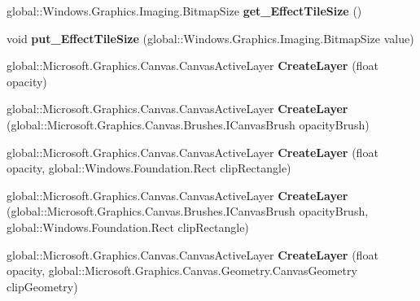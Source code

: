 \begin{DoxyCompactItemize}
global\+::\+Windows.\+Graphics.\+Imaging.\+Bitmap\+Size {\bfseries get\+\_\+\+Effect\+Tile\+Size} ()
\item 
\mbox{\label{class_microsoft_1_1_graphics_1_1_canvas_1_1_canvas_drawing_session_a1117e02a854af2c00904eea362dfe10f}} 
void {\bfseries put\+\_\+\+Effect\+Tile\+Size} (global\+::\+Windows.\+Graphics.\+Imaging.\+Bitmap\+Size value)
\item 
\mbox{\label{class_microsoft_1_1_graphics_1_1_canvas_1_1_canvas_drawing_session_acdb06f146f507d5ed91c5780afe92052}} 
global\+::\+Microsoft.\+Graphics.\+Canvas.\+Canvas\+Active\+Layer {\bfseries Create\+Layer} (float opacity)
\item 
\mbox{\label{class_microsoft_1_1_graphics_1_1_canvas_1_1_canvas_drawing_session_a5e5f209e443e8e7be3fe82510d320872}} 
global\+::\+Microsoft.\+Graphics.\+Canvas.\+Canvas\+Active\+Layer {\bfseries Create\+Layer} (global\+::\+Microsoft.\+Graphics.\+Canvas.\+Brushes.\+I\+Canvas\+Brush opacity\+Brush)
\item 
\mbox{\label{class_microsoft_1_1_graphics_1_1_canvas_1_1_canvas_drawing_session_ae49a5c754d55c9c011190ba2f3b78a48}} 
global\+::\+Microsoft.\+Graphics.\+Canvas.\+Canvas\+Active\+Layer {\bfseries Create\+Layer} (float opacity, global\+::\+Windows.\+Foundation.\+Rect clip\+Rectangle)
\item 
\mbox{\label{class_microsoft_1_1_graphics_1_1_canvas_1_1_canvas_drawing_session_a4b53f77bb1b1fec2b77053ee210876d1}} 
global\+::\+Microsoft.\+Graphics.\+Canvas.\+Canvas\+Active\+Layer {\bfseries Create\+Layer} (global\+::\+Microsoft.\+Graphics.\+Canvas.\+Brushes.\+I\+Canvas\+Brush opacity\+Brush, global\+::\+Windows.\+Foundation.\+Rect clip\+Rectangle)
\item 
\mbox{\label{class_microsoft_1_1_graphics_1_1_canvas_1_1_canvas_drawing_session_a42690fb34cb40ed3182a4915a425c536}} 
global\+::\+Microsoft.\+Graphics.\+Canvas.\+Canvas\+Active\+Layer {\bfseries Create\+Layer} (float opacity, global\+::\+Microsoft.\+Graphics.\+Canvas.\+Geometry.\+Canvas\+Geometry clip\+Geometry)

\end{DoxyCompactItemize}
